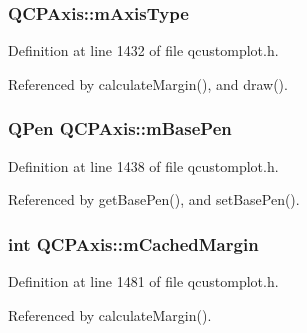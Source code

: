 \hypertarget{class_q_c_p_axis_ae704bf9f2c2b026f08dd4ccad79c616e}{}
\subsubsection[{m\+Axis\+Type}]{ Q\+C\+P\+Axis\+::m\+Axis\+Type\hspace{0.3cm}{\ttfamily [protected]}}\label{class_q_c_p_axis_ae704bf9f2c2b026f08dd4ccad79c616e}


Definition at line 1432 of file qcustomplot.\+h.



Referenced by calculate\+Margin(), and draw().

\hypertarget{class_q_c_p_axis_ad6b4a0aee9558fb35529e960b8fef72d}{}
\subsubsection[{m\+Base\+Pen}]{\setlength{\rightskip}{0pt plus 5cm}Q\+Pen Q\+C\+P\+Axis\+::m\+Base\+Pen\hspace{0.3cm}{\ttfamily [protected]}}\label{class_q_c_p_axis_ad6b4a0aee9558fb35529e960b8fef72d}


Definition at line 1438 of file qcustomplot.\+h.



Referenced by get\+Base\+Pen(), and set\+Base\+Pen().

\hypertarget{class_q_c_p_axis_a48ace55cbd54f7241e7f1b06fd369b64}{}
\subsubsection[{m\+Cached\+Margin}]{\setlength{\rightskip}{0pt plus 5cm}int Q\+C\+P\+Axis\+::m\+Cached\+Margin\hspace{0.3cm}{\ttfamily [protected]}}\label{class_q_c_p_axis_a48ace55cbd54f7241e7f1b06fd369b64}


Definition at line 1481 of file qcustomplot.\+h.



Referenced by calculate\+Margin().

